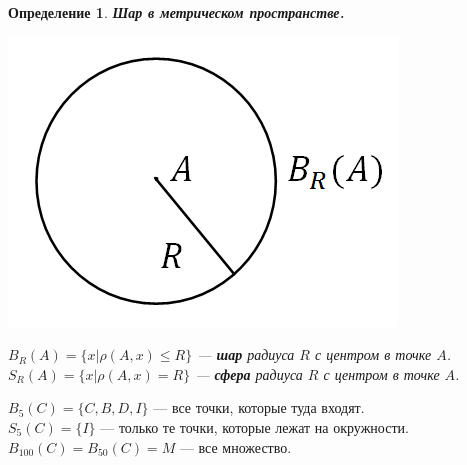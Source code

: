 \documentclass[12pt]{article}
\newtheorem*{definition}{Определение}
\begin{document}
	\begin{definition}
	\textbf{Шар в метрическом пространстве.}\begin{center}
		\includegraphics[scale=0.5]{l4_2.png}\end{center}
	$B_R(A) = \{x | \rho(A, x) \leqslant R \}$ --- \textbf{шар} радиуса $R$ с центром в точке $A$.\\ 
	$S_R(A) = \{x | \rho(A, x) = R \}$ --- \textbf{сфера} радиуса $R$ с центром в точке $A$.
	\end{definition}
	$B_5(C) = \{ C, B, D, I \}$ --- все точки, которые туда входят. \\
	$S_5(C) = \{ I \}$ --- только те точки, которые лежат на окружности. \\
	$B_{100}(C) = B_{50} (C) = M $ --- все множество. \\
	
\end{document}
